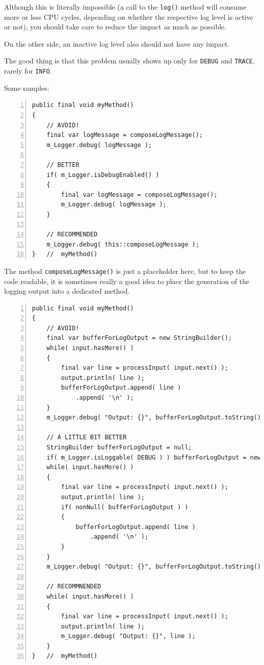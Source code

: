 \documentclass[11pt,a4paper, titlepage, parskip=half, headsepline, footsepline, cleardoublepage=current, headheight=1cm]{scrbook}
\begin{document}
Although this is literally impossible (a call to the \lstinline|log()| method will consume more or less CPU cycles, depending on whether the respective log level is active or not), you should take care to reduce the impact as much as possible.

On the other side, an inactive log level also should not have any impact.

The good thing is that this problem usually shows up only for \verb#DEBUG# and \verb#TRACE#, rarely for \verb#INFO#.

Some samples:
\begin{lstlisting}[numbers=left]
public final void myMethod()
{
    // AVOID!
    final var logMessage = composeLogMessage();
    m_Logger.debug( logMessage );
    
    // BETTER
    if( m_Logger.isDebugEnabled() )
    {
        final var logMessage = composeLogMessage();
        m_Logger.debug( logMessage );
    }
    
    // RECOMMENDED
    m_Logger.debug( this::composeLogMessage );
}   //  myMethod()
\end{lstlisting}

The method \lstinline|composeLogMessage()| is just a placeholder here, but to keep the code readable, it is sometimes really a good idea to place the generation of the logging output into a dedicated method.

\begin{lstlisting}[numbers=left]
public final void myMethod()
{
    // AVOID!
    final var bufferForLogOutput = new StringBuilder();
    while( input.hasMore() )
    {
        final var line = processInput( input.next() );
        output.println( line );
        bufferForLogOutput.append( line )
            .append( '\n' );
    }
    m_Logger.debug( "Output: {}", bufferForLogOutput.toString() );
    
    // A LITTLE BIT BETTER
    StringBuilder bufferForLogOutput = null;
    if( m_Logger.isLoggable( DEBUG ) ) bufferForLogOutput = new StringBuilder();
    while( input.hasMore() )
    {
        final var line = processInput( input.next() );
        output.println( line );
        if( nonNull( bufferForLogOutput ) )
        {
        	bufferForLogOutput.append( line )
            	.append( '\n' );
        }
    }
    m_Logger.debug( "Output: {}", bufferForLogOutput.toString() );
    
    // RECOMMNENDED
    while( input.hasMore() )
    {
        final var line = processInput( input.next() );
        output.println( line );
        m_Logger.debug( "Output: {}", line );
    }
}   //  myMethod()
\end{lstlisting}
\end{document}
